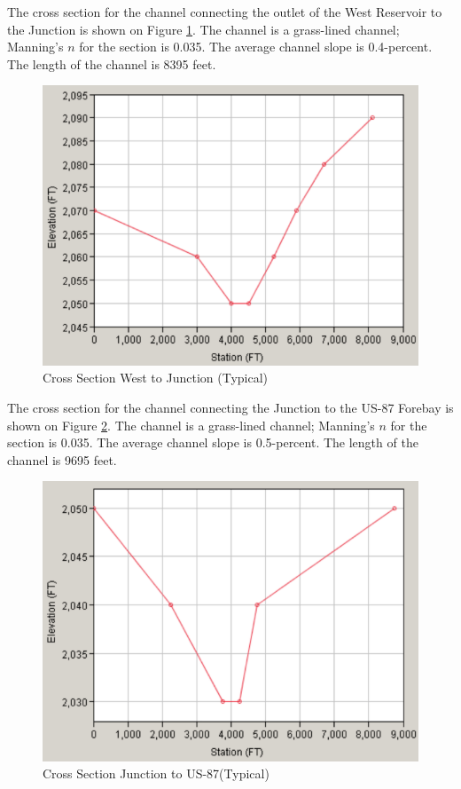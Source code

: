 \documentclass[12pt]{article}
\begin{document}
\begin{enumerate}
\clearpage

The cross section for the channel connecting the outlet of the West Reservoir to the Junction is shown on Figure \ref{fig:CS_West}. The channel is a grass-lined
channel; Manning’s $n$ for the section is 0.035. The average channel slope is 0.4-percent. The length of the channel is 8395 feet.

\begin{figure}[h!] %
   \centering
   \includegraphics[width=6in]{CS_West.png} 
   \caption{Cross Section West to Junction (Typical)}
   \label{fig:CS_West}
\end{figure}

\clearpage

The cross section for the channel connecting the Junction to the US-87 Forebay is shown on Figure \ref{fig:CS_Junction}. The channel is a grass-lined
channel; Manning’s $n$ for the section is 0.035. The average channel slope is 0.5-percent. The length of the channel is 9695 feet.

\begin{figure}[h!] %
   \centering
   \includegraphics[width=6in]{CS_Junction.png} 
   \caption{Cross Section Junction to US-87(Typical)}
   \label{fig:CS_Junction}
\end{figure}


\end{enumerate}
\end{document}
